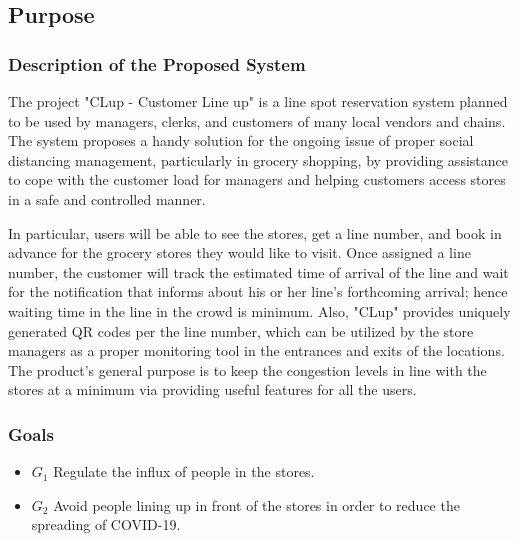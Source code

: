 \subsection{Purpose}

\subsubsection{Description of the Proposed System}
The project "CLup - Customer Line up" is a line spot reservation system planned to be used by managers, clerks, and customers of many local vendors and chains.
The system proposes a handy solution for the ongoing issue of proper social distancing management, particularly in grocery shopping, by providing assistance to cope with the customer load for managers and helping customers access stores in a safe and controlled manner.

In particular, users will be able to see the stores, get a line number, and book in advance for the grocery stores they would like to visit.
Once assigned a line number, the customer will track the estimated time of arrival of the line and wait for the notification that informs about his or her line's forthcoming arrival; hence waiting time in the line in the crowd is minimum.
Also, "CLup" provides uniquely generated QR codes per the line number, which can be utilized by the store managers as a proper monitoring tool in the entrances and exits of the locations.
The product's general purpose is to keep the congestion levels in line with the stores at a minimum via providing useful features for all the users.




\subsubsection{Goals}

\begin{itemize}
    \item \textbf{$G_{1}$} Regulate the influx of people in the stores.
    \item \textbf{$G_{2}$} Avoid people lining up in front of the stores in order to reduce the spreading of COVID-19.
\end{itemize}


